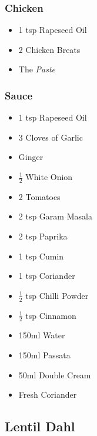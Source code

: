 \documentclass[11pt, english]{article}
\begin{document}
		\subsubsection*{Chicken}

	\begin{itemize}
        \setlength\itemsep{0cm}
                \item 1 tsp Rapeseed Oil
		\item 2 Chicken Breats
		\item The \textit{Paste}
        \end{itemize}

		\subsubsection*{Sauce}

	\begin{itemize}
        \setlength\itemsep{0cm}
                \item 1 tsp Rapeseed Oil
		\item 3 Cloves of Garlic
		\item Ginger
		\item $\frac{1}{2}$ White Onion
		\item 2 Tomatoes
		\item 2 tsp Garam Masala
		\item 2 tsp Paprika
		\item 1 tsp Cumin
		\item 1 tsp Coriander
		\item $\frac{1}{2}$ tsp Chilli Powder
		\item $\frac{1}{2}$ tsp Cinnamon
		\item 150ml Water
		\item 150ml Passata
		\item 50ml Double Cream
		\item Fresh Coriander
        \end{itemize}

\newpage

	\subsection{Lentil Dahl}
\end{document}

